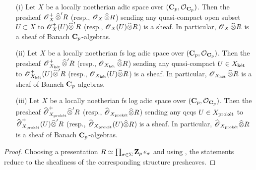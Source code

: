 \begin{Lemma}\label{Lemma: structure sheaf mixed completed tensor}
\begin{itemize}
\item[(i)] Let $X$ be a locally noetherian adic space over $(\C_p, \calO_{\C_p})$. Then the presheaf $\scrO^+_X\widehat{\otimes}' R$ (resp., $\scrO_X\widehat{\otimes} R$) sending any quasi-compact open subset $U\subset X$ to $\scrO^+_X(U)\widehat{\otimes}'R$ (resp., $\scrO_X(U)\widehat{\otimes}R$) is a sheaf. In particular, $\scrO_X\widehat{\otimes} R$ is a sheaf of Banach $\C_p$-algebras.
\item[(ii)] Let $X$ be a locally noetherian fs log adic space over $(\C_p, \calO_{\C_p})$. Then the presheaf $\scrO^+_{X_{\ket}}\widehat{\otimes}' R$ (resp., $\scrO_{X_{\ket}}\widehat{\otimes} R$) sending any quasi-compact $U\in X_{\ket}$ to $\scrO^+_{X_{\ket}}(U)\widehat{\otimes}'R$ (resp., $\scrO_{X_{\ket}}(U)\widehat{\otimes}R$) is a sheaf. In particular, $\scrO_{X_{\ket}}\widehat{\otimes} R$ is a sheaf of Banach $\C_p$-algebras.
\item[(iii)] Let $X$ be a locally noetherian fs log adic space over $(\C_p, \calO_{\C_p})$. Then the presheaf $\widehat{\scrO}^+_{X_{\proket}}\widehat{\otimes}' R$ (resp., $\widehat{\scrO}_{X_{\proket}}\widehat{\otimes} R$) sending any qcqs $U\in X_{\proket}$ to $\widehat{\scrO}^+_{X_{\proket}}(U)\widehat{\otimes}'R$ (resp., $\widehat{\scrO}_{X_{\proket}}(U)\widehat{\otimes}R$) is a sheaf. In particular, $\widehat{\scrO}_{X_{\proket}}\widehat{\otimes} R$ is a sheaf of Banach $\C_p$-algebras.
\end{itemize}
\end{Lemma}

\begin{proof}
Choosing a presentation $R\simeq \prod_{\sigma\in \Sigma} \Z_p e_\sigma$ and using \cite[Proposition 6.4]{CHJ-2017}, the statements reduce to the sheafiness of the corresponding structure presheaves.
\end{proof}

